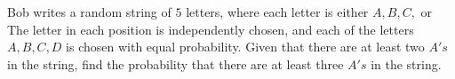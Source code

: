 Bob writes a random string of $5$ letters, where each letter is either $A, B, C,$ or  The letter in each position is independently chosen, and each of the letters $A, B, C, D$ is chosen with equal probability. Given that there are at least two $A's$ in the string, find the probability that there are at least three $A's$ in the string.